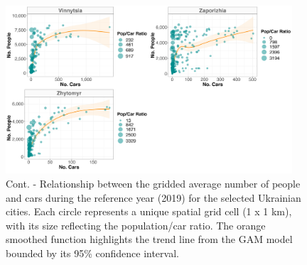 \documentclass[sn-basic]{sn-jnl}%
\begin{document}
{\begin{appendices}
\begin{figure}[h!]
\begin{center}
\includegraphics[width=0.95\textwidth]{Figures/popcar_S5.jpg}
\end{center}
\caption{Cont. - Relationship between the gridded average number of people and cars during the reference year (2019) for the selected Ukrainian cities. Each circle represents a unique spatial grid cell (1 x 1 km), with its size reflecting the population/car ratio. The orange smoothed function highlights the trend line from the GAM model bounded by its 95\% confidence interval.}
\label{figSM_PopCar_05}
\end{figure}




\end{appendices}}
\end{document}

